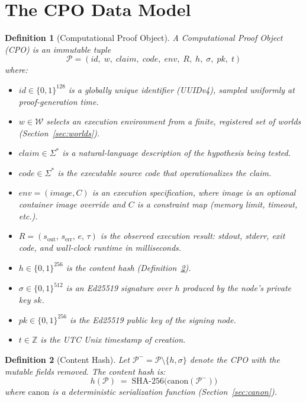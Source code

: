 \documentclass[11pt]{article}
\newtheorem{definition}{Definition}
\begin{document}
\section{The CPO Data Model}
\label{sec:model}

\begin{definition}[Computational Proof Object]
\label{def:cpo}
A \emph{Computational Proof Object} (CPO) is an immutable tuple
\[
  \mathcal{P} = (\textit{id},\; w,\; \textit{claim},\;
                  \textit{code},\; \textit{env},\; R,\; h,\; \sigma,\;
                  \textit{pk},\; t)
\]
where:
\begin{itemize}
  \item $\textit{id} \in \{0,1\}^{128}$ is a globally unique identifier
        (UUIDv4), sampled uniformly at proof-generation time.
  \item $w \in \mathcal{W}$ selects an execution environment from a finite,
        registered set of worlds (Section~\ref{sec:worlds}).
  \item $\textit{claim} \in \Sigma^*$ is a natural-language description of
        the hypothesis being tested.
  \item $\textit{code} \in \Sigma^*$ is the executable source code that
        operationalizes the claim.
  \item $\textit{env} = (\textit{image}, C)$ is an execution specification,
        where \textit{image} is an optional container image override and
        $C$ is a constraint map (memory limit, timeout, etc.).
  \item $R = (s_{\mathrm{out}},\, s_{\mathrm{err}},\, e,\, \tau)$ is the
        observed execution result: stdout, stderr, exit code, and wall-clock
        runtime in milliseconds.
  \item $h \in \{0,1\}^{256}$ is the content hash
        (Definition~\ref{def:hash}).
  \item $\sigma \in \{0,1\}^{512}$ is an Ed25519 signature over $h$
        produced by the node's private key $\mathit{sk}$.
  \item $\textit{pk} \in \{0,1\}^{256}$ is the Ed25519 public key of the
        signing node.
  \item $t \in \mathbb{Z}$ is the UTC Unix timestamp of creation.
\end{itemize}
\end{definition}

\begin{definition}[Content Hash]
\label{def:hash}
Let $\mathcal{P}^- = \mathcal{P} \setminus \{h, \sigma\}$ denote the CPO
with the mutable fields removed.  The content hash is:
\begin{equation}
  h(\mathcal{P}) \;=\; \mathrm{SHA\text{-}256}\bigl(
    \mathrm{canon}(\mathcal{P}^-)\bigr)
  \label{eq:hash}
\end{equation}
where $\mathrm{canon}$ is a deterministic serialization function
(Section~\ref{sec:canon}).
\end{definition}
\end{document}
